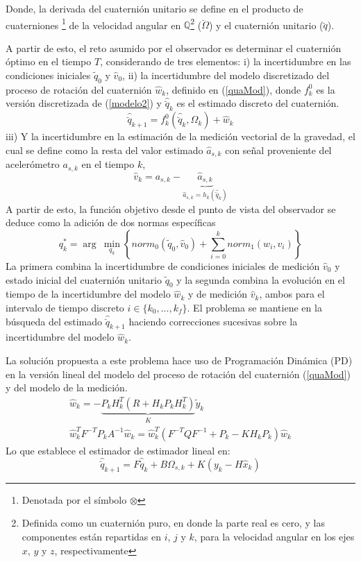 \documentclass[conference]{IEEEtran}
\begin{document}
Donde, la derivada del cuaternión unitario se define en el producto de cuaterniones \footnote{Denotada por el símbolo $\otimes$} de la velocidad angular en $\mathbb{Q}$\footnote{Definida como un cuaternión puro, en donde la parte real es cero, y las componentes están repartidas en $i$, $j$ y $k$, para la velocidad angular en los ejes $x$, $y$ y $z$, respectivamente} ($\breve{\Omega}$) y el cuaternión unitario ($\breve{q}$).\par
A partir de esto, el reto asumido por el observador es determinar el cuaternión óptimo en el tiempo $T$, considerando de tres elementos: i) la incertidumbre en las condiciones iniciales $\tilde{q}_0$ y $\hat{v}_0$, ii) la incertidumbre del modelo discretizado del proceso de rotación del cuaternión $\hat{w}_k$, definido en (\ref{quaMod}), donde $f^0_k$ es la versión discretizada de (\ref{modelo2}) y $\hat{\breve{q}}_{k}$ es el estimado discreto del cuaternión.
\begin{equation}
\label{quaMod}
\hat{\breve{q}}_{k+1}=f^0_k(\hat{\breve{q}}_k,\Omega_k)+\hat{w}_k
\end{equation}
iii) Y la incertidumbre en la estimación de la medición vectorial de la gravedad, el cual se define como la resta del valor estimado $\hat{a}_{s,k}$ con señal proveniente del acelerómetro $a_{s,k}$ en el tiempo $k$,
\begin{equation}
\hat{v}_k=a_{s,k}-\underbrace{\hat{a}_{s,k}}_{\hat{a}_{s,k}=h_k(\hat{\breve{q}}_k)}
\end{equation}
A partir de esto, la función objetivo desde el punto de vista del observador se deduce como la adición de dos normas específicas
\begin{equation}
q^*_k=\arg~\min_{q_k}\left\{norm_0(\tilde{q}_0,\hat{v}_0)+\sum^k_{i=0}norm_1(w_i,v_i)\right\}
\end{equation}
La primera combina la incertidumbre de condiciones iniciales de medición $\hat{v}_0$ y estado inicial del cuaternión unitario $\tilde{q}_0$ y la segunda combina la evolución en el tiempo de la incertidumbre del modelo $\hat{w}_k$ y de medición $\hat{v}_k$, ambos para el intervalo de tiempo discreto $i\in\{k_0,...,k_f\}$. El problema se mantiene en la búsqueda del estimado $\hat{\breve{q}}_{k+1}$ haciendo correcciones sucesivas sobre la incertidumbre del modelo $\hat{w}_k$.\par
La solución propuesta a este problema hace uso de Programación Dinámica (PD) \cite{Lewis2012} en la versión lineal del modelo del proceso de rotación del cuaternión (\ref{quaMod}) y del modelo de la medición.
\begin{gather}
\hat{w}_{k}=-\underbrace{P_kH_k^T(R+H_kP_kH_k^T)}_K\tilde{y}_k\\
\hat{w}_k^TF^{-T}P_kA^{-1}\hat{w}_k=\hat{w}_k^T(F^{-T}QF^{-1}+P_k-KH_kP_k)\hat{w}_k
\end{gather}
Lo que establece el estimador de estimador lineal en:
\begin{equation}\label{chap2:ObservadorLineal}
\hat{\breve{q}}_{k+1}=F\hat{\breve{q}}_k+B\Omega_{s,k}+K(y_k-H\hat{x}_k)
\end{equation}
\end{document}

